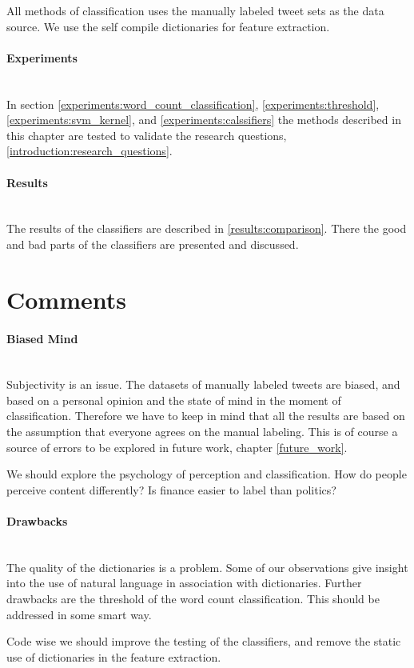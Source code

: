 All methods of classification uses the manually labeled tweet sets as the data
source. We use the self compile dictionaries for feature extraction.

\paragraph{Experiments}
\hspace{0pt}\\
In section \ref{experiments:word_count_classification},
\ref{experiments:threshold}, \ref{experiments:svm_kernel}, and
\ref{experiments:calssifiers} the methods described in this chapter are tested
to validate the research questions, \ref{introduction:research_questions}.

\paragraph{Results}
\hspace{0pt}\\
The results of the classifiers are described in \ref{results:comparison}. There
the good and bad parts of the classifiers are presented and discussed. 
%

\section{Comments}\label{sentiment:comments_discussion}

\paragraph{Biased Mind}
\hspace{0pt}\\
Subjectivity is an issue. The datasets of manually labeled tweets are biased,
and based on a personal opinion and the state of mind in the moment of
classification. Therefore we have to keep in mind that all the results are based
on the assumption that everyone agrees on the manual labeling. This is of course
a source of errors to be explored in future work, chapter \ref{future_work}. 

We should explore the psychology of perception and classification. How do
people perceive content differently? Is finance easier to label than politics?

\paragraph{Drawbacks}
\hspace{0pt}\\
The quality of the dictionaries is a problem. Some of our observations give
insight into the use of natural language in association with dictionaries. 
Further drawbacks are the threshold of the word count classification. This
should be addressed in some smart way. 

Code wise we should improve the testing of the classifiers, and remove the
static use of dictionaries in the feature extraction.  
%
